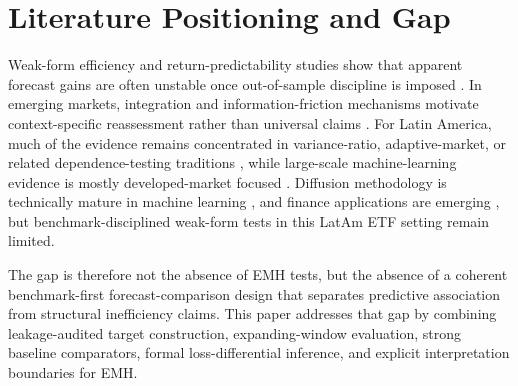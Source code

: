 \section{Literature Positioning and Gap}

Weak-form efficiency and return-predictability studies show that apparent forecast gains are often unstable once out-of-sample discipline is imposed \parencite{lomackinlay1988,welchgoyal2008,campbellthompson2008,rapach2010}. In emerging markets, integration and information-friction mechanisms motivate context-specific reassessment rather than universal claims \parencite{harvey1995,bekaertharvey1995}. For Latin America, much of the evidence remains concentrated in variance-ratio, adaptive-market, or related dependence-testing traditions \parencite{urrutia1995,sanchezgranero2020,lo2004,cruzhernandez2024}, while large-scale machine-learning evidence is mostly developed-market focused \parencite{gu2020}. Diffusion methodology is technically mature in machine learning \parencite{ho2020,song2021}, and finance applications are emerging \parencite{cho2026}, but benchmark-disciplined weak-form tests in this LatAm ETF setting remain limited.

The gap is therefore not the absence of EMH tests, but the absence of a coherent benchmark-first forecast-comparison design that separates predictive association from structural inefficiency claims. This paper addresses that gap by combining leakage-audited target construction, expanding-window evaluation, strong baseline comparators, formal loss-differential inference, and explicit interpretation boundaries for EMH.
